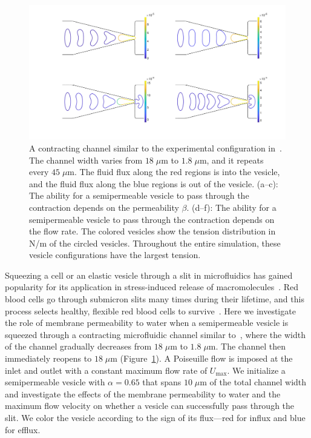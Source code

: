 \documentclass[prb,preprint,showpacs,preprintnumbers,amsmath,amssymb,longbibliography]{revtex4-1}
\begin{document}
\begin{figure}[htp]
\begin{minipage}{0.45\textwidth}
  \includegraphics[width=\textwidth]{figures/contractingTensions2.pdf}
  \end{minipage}
  \fi
  \caption{\label{fig:contractingComposite} A contracting channel
  similar to the experimental configuration in~\cite{wu2015critical}.
  The channel width varies from $18\;\mu$m to $1.8\;\mu$m, and it
  repeats every $45\;\mu$m. The fluid flux along the red regions is into
  the vesicle, and the fluid flux along the blue regions is out of the
  vesicle.  (a--c): The ability for a semipermeable vesicle to pass
  through the contraction depends on the permeability $\beta$. (d--f):
  The ability for a semipermeable vesicle to pass through the
  contraction depends on the flow rate. The colored vesicles show the
  tension distribution in N/m of the circled vesicles. Throughout the
  entire simulation, these vesicle configurations have the largest
  tension.}
\end{figure}

Squeezing a cell or an elastic vesicle through a slit in microfluidics
has gained popularity for its application in stress-induced release of
macromolecules~\cite{ShareiEtAl2013_PNAS, Pak2015_PNAS,
ZhangShenHoganBarakatMisbah2018_BJ, LuoBai2019_PoF}. Red blood cells go
through submicron slits many times during their lifetime, and this
process selects healthy, flexible red blood cells to
survive~\cite{wu2015critical,LuPeng2019_PoF}. Here we investigate the
role of membrane permeability to water when a semipermeable vesicle is
squeezed through a contracting microfluidic channel similar
to~\cite{wu2015critical}, where the width of the channel gradually
decreases from $18 \;\mu$m to $1.8\; \mu$m. The channel then immediately
reopens to $18\;\mu$m (Figure~\ref{fig:contractingComposite}). A
Poiseuille flow is imposed at the inlet and outlet with a constant
maximum flow rate of $U_{\max}$. We initialize a semipermeable vesicle
with $\alpha = 0.65$ that spans $10\; \mu$m of the total channel width
and investigate the effects of the membrane permeability to water and
the maximum flow velocity on whether a vesicle can successfully pass
through the slit. We color the vesicle according to the sign of its
flux---red for influx and blue for efflux.
\end{document}
